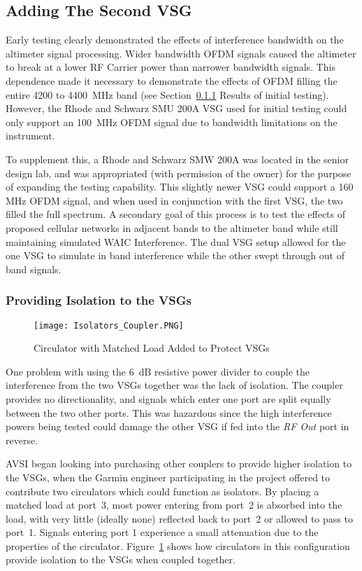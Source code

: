 \subsection{Adding The Second VSG}
Early testing clearly demonstrated the effects of interference bandwidth on the altimeter signal processing. Wider bandwidth OFDM signals caused the altimeter to break at a lower RF Carrier power than narrower bandwidth signals. This dependence made it necessary to demonstrate the effects of OFDM filling the entire 4200 to 4400~MHz band (see Section~\ref{} Results of initial testing).
However, the Rhode and Schwarz SMU 200A VSG used for initial testing could only support an 100~MHz OFDM signal due to bandwidth limitations on the instrument.  

To supplement this, a Rhode and Schwarz SMW 200A was located in the senior design lab, and was appropriated (with permission of the owner) for the purpose of expanding the testing capability. This slightly newer VSG could support a 160 MHz OFDM signal, and when used in conjunction with the first VSG, the two filled the full spectrum. A secondary goal of this process is to test the effects of proposed cellular networks in adjacent bands to the altimeter band while still maintaining simulated WAIC Interference. The dual VSG setup allowed for the one VSG to simulate in band interference while the other swept through out of band signals. 

\subsubsection{Providing Isolation to the VSGs}
\begin{figure}[ht]
\centering
\texttt{[image: Isolators\_Coupler.PNG]}
\caption{Circulator with Matched Load Added to Protect VSGs}

\label{fig:circulator}
\end{figure}
One problem with using the 6~dB resistive power divider to couple the interference from the two VSGs together was the lack of isolation. The coupler provides no directionality, and signals which enter one port are split equally between the two other ports. This was hazardous since the high interference powers being tested could damage the other VSG if fed into the \textit{RF Out} port in reverse. 

AVSI began looking into purchasing other couplers to provide higher isolation to the VSGs, when the Garmin engineer participating in the project offered to contribute two circulators which could function as isolators. By placing a matched load at port~3, most power entering from port~2 is absorbed into the load, with very little (ideally none) reflected back to port~2 or allowed to pass to port~1. Signals entering port 1 experience a small attenuation due to the properties of the circulator. Figure~\ref{fig:circulator} shows how circulators in this configuration provide isolation to the VSGs when coupled together. 

